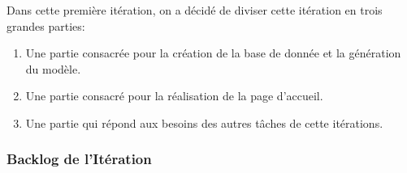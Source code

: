 Dans cette première itération, on a décidé de diviser cette itération en trois
grandes parties:

\begin{enumerate}
 \item Une partie consacrée pour la création de la base de donnée et la
     génération du modèle.
 \item Une partie consacré pour la réalisation de la page d'accueil.
 \item Une partie qui répond aux besoins des autres tâches de cette itérations.
\end{enumerate}

\subsubsection{Backlog de l'Itération}

